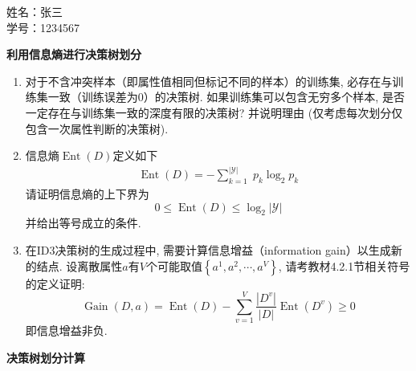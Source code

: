 \documentclass[answers]{exam}  %
\begin{document}
\Large
\noindent 
姓名：张三 \\
学号：1234567 \\
\begin{questions}
\question [20] \textbf{利用信息熵进行决策树划分}

\begin{enumerate}
    \item  对于不含冲突样本（即属性值相同但标记不同的样本）的训练集, 必存在与训练集一致（训练误差为0）的决策树. 如果训练集可以包含无穷多个样本, 是否一定存在与训练集一致的深度有限的决策树? 并说明理由 (仅考虑每次划分仅包含一次属性判断的决策树).
    \item 
    信息熵$\operatorname{Ent}(D)$定义如下
    \begin{align}
        \operatorname{Ent}(D)=-\sum_{k=1}^{|\mathcal{Y}|}\; p_{k} \log_{2} p_{k}\label{ch4_eq:entropy}
    \end{align}
    请证明信息熵的上下界为
     \begin{equation}
        0 \leq \operatorname{Ent}(D)\leq \log _{2}|\mathcal{Y}|
    \end{equation}
    并给出等号成立的条件. 
	\item  在ID3决策树的生成过程中, 需要计算信息增益（information gain）以生成新的结点. 设离散属性$a$有$V$个可能取值$\left\{a^{1}, a^{2}, \cdots, a^{V}\right\}$, 请考教材4.2.1节相关符号的定义证明:
    \begin{equation}
        \operatorname{Gain}(D, a)=\operatorname{Ent}(D)-\sum_{v=1}^{V} \frac{\left|D^{v}\right|}{|D|} \operatorname{Ent}\left(D^{v}\right) \geq 0
    \end{equation}
    即信息增益非负.
\end{enumerate}
	\begin{solution}
	\end{solution}


\question [15] \textbf{决策树划分计算} \label{ch4_prob:get_tree}


\end{questions}
\end{document}
